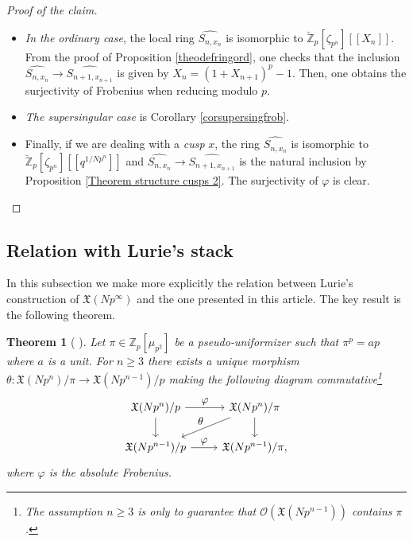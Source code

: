 \documentclass[JEP,XML,SOM,Unicode,published]{cedram}
\let\ts\textstyle
\newcommand{\lcr}{[\![}
\newcommand{\rcr}{]\!]}
\numberwithin{equation}{section}
\newtheorem{theo}[prop]{Theorem}
\theoremstyle{definition}
\newcommand{\bb}[1]{\mathbb{#1}}
\newcommand{\f}[1]{\mathfrak{#1}}
\newcommand{\s}[1]{\mathscr{#1}}
\begin{document}
\begin{proof}[Proof of the claim]
\begin{itemize}

\item \textit{In the ordinary case}, the local ring $\widehat{S_{n,x_n}}$ is isomorphic to $ \breve{\bb{Z}}_p[\zeta_{p^n}]\lcr X_n\rcr$. From the proof of Proposition \ref{theodefringord}, one checks that the inclusion $\widehat{S_{n,x_n}}\to \widehat{S_{n+1,x_{n+1}}}$ is given by $X_{n}=(1+X_{n+1})^p-1$. Then, one obtains the surjectivity of Frobenius when reducing modulo $p$.

\item \textit{The supersingular case} is Corollary \ref{corsupersingfrob}.

\item Finally, if we are dealing with a \emph{cusp} $x$, the ring $\widehat{S_{n,x_n}}$ is isomorphic to $\breve{\bb{Z}}_p[\zeta_{p^{n}}]\lcr q^{1/Np^{n}}\rcr$ and $\widehat{S_{n,x_n}}\to \widehat{S_{n+1,x_{n+1}}}$ is the natural inclusion by Proposition \ref{Theorem structure cusps 2}. The surjectivity of $\varphi$ is clear.\qedhere
\end{itemize}
\end{proof}

\subsection*{Relation with Lurie's stack}

In this subsection we make more explicitly the relation between Lurie's construction of $\f{X}(Np^\infty)$ and the one presented in this article. The key result is the following theorem.

\begin{theo}[ {\cite[Th.\,1.9]{JacobFullLevel2019}}]
Let $\pi\in \bb{Z}_p[\mu_{p^2}]$ be a pseudo-uniformizer such that $\pi^p=ap$ where $a$ is a unit. For $n\geq 3$ there exists a unique morphism \hbox{$\theta: \f{X}(Np^n)/ \pi \to \f{X}(Np^{n-1})/p$} making the following diagram commutative\footnote{The assumption $n\geq 3$ is only to guarantee that $\s{O}(\f{X}(Np^{n-1}))$ contains $\pi$.}
\[
\begin{tikzcd}
\f{X}(Np^n)/p \ar[d] \ar[r, "\ts\varphi"] & \f{X}(Np^n)/\pi \ar[d] \ar[dl, "\ts\theta"'] \\
\f{X}(Np^{n-1})/p \ar[r, "\ts\varphi"] & \f{X}(Np^{n-1})/ \pi,
\end{tikzcd}
\]
where $\varphi$ is the absolute Frobenius.
\end{theo}
\end{document}
